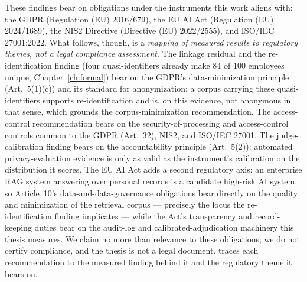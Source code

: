 \documentclass[11pt,a4paper]{report}
\begin{document}
These findings bear on obligations under the instruments this work aligns with: the GDPR
(Regulation (EU) 2016/679), the EU AI Act (Regulation (EU) 2024/1689), the NIS2 Directive (Directive
(EU) 2022/2555), and ISO/IEC 27001:2022.
What follows, though, is a \emph{mapping of measured results to regulatory themes, not a legal compliance
assessment}. The linkage residual and the re-identification finding (four quasi-identifiers already make
$84$ of $100$ employees unique, Chapter~\ref{ch:formal}) bear on the GDPR's data-minimization principle
(Art.\ 5(1)(c)) and its standard for anonymization: a corpus carrying these quasi-identifiers supports
re-identification and is, on this evidence, not anonymous in that sense, which grounds the
corpus-minimization recommendation. The access-control recommendation bears on the security-of-processing
and access-control controls common to the GDPR (Art.\ 32), NIS2, and ISO/IEC 27001. The judge-calibration
finding bears on the accountability principle (Art.\ 5(2)): automated privacy-evaluation evidence is only
as valid as the instrument's calibration on the distribution it scores. The EU AI Act adds a second
regulatory axis: an enterprise RAG system answering over personal records is a candidate high-risk AI
system, so Article~10's data-and-data-governance obligations bear directly on the quality and
minimization of the retrieval corpus --- precisely the locus the re-identification finding implicates ---
while the Act's transparency and record-keeping duties bear on the audit-log and calibrated-adjudication
machinery this thesis measures. We claim no more than relevance to
these obligations; we do not certify compliance, and the thesis is not a legal document.  traces each recommendation to the measured finding behind it and the regulatory theme it bears on.
\end{document}

